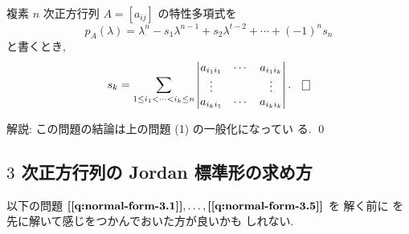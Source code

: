 \documentclass[12pt,twoside]{jarticle}
\begin{document}

\begin{question}[20点]
  複素 $n$ 次正方行列 $A=[a_{ij}]$ の特性多項式を
  \begin{equation*}
    p_A(\lambda) 
    = \lambda^n - s_1 \lambda^{n-1} + s_2 \lambda^{t-2} + \cdots + (-1)^n s_n
  \end{equation*}
  と書くとき,
  \begin{equation*}
    s_k = \sum_{1\le i_1<\cdots<i_k\le n}
    \begin{vmatrix}
      a_{i_1i_1} & \cdots & a_{i_1i_k} \\
      \vdots     &        & \vdots \\
      a_{i_ki_1} & \cdots & a_{i_ki_k} \\
    \end{vmatrix}.
    \qed
  \end{equation*}
\end{question}

\noindent 
解説: この問題の結論は上の問題  (1) の一般化になってい
る.
\qed


\subsection{$3$ 次正方行列の Jordan 標準形の求め方}
\label{sec:3x3-Jordan}

以下の問題 %
$\text{\qref{q:normal-form-3.1}},\ldots,\text{\qref{q:normal-form-3.5}}$ を
解く前に  を先に解いて感じをつかんでおいた方が良いかも
しれない. 

\end{document}
